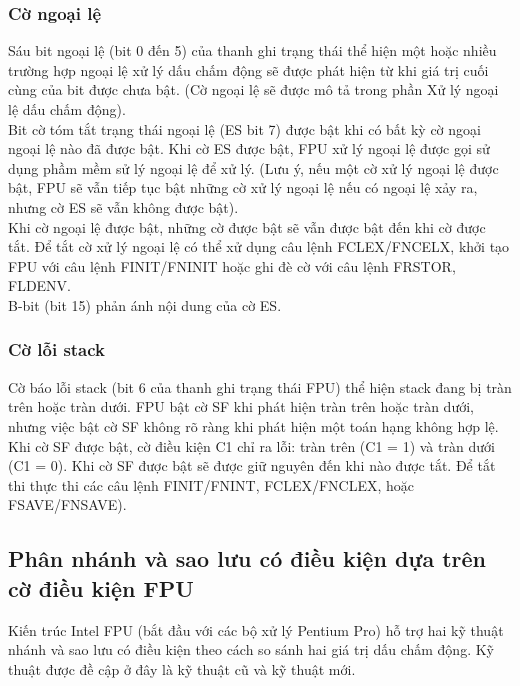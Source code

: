 		\subsubsection*{ Cờ ngoại lệ}
	Sáu bit ngoại lệ (bit 0 đến 5) của thanh ghi trạng thái thể hiện một hoặc nhiều trường hợp ngoại lệ xử lý dấu chấm động sẽ được phát hiện từ khi giá trị cuối cùng của bit được chưa bật. (Cờ ngoại lệ sẽ được mô tả trong phần Xử lý ngoại lệ dấu chấm động). \\

	Bit cờ tóm tắt trạng thái ngoại lệ (ES bit 7) được bật khi có bất kỳ cờ ngoại ngoại lệ nào đã được bật. Khi cờ ES được bật, FPU xử lý ngoại lệ được gọi sử dụng phầm mềm sử lý ngoại lệ để xử lý. (Lưu ý, nếu một cờ xử lý ngoại lệ được bật, FPU sẽ vẫn tiếp tục bật những cờ xử lý ngoại lệ nếu có ngoại lệ xảy ra, nhưng cờ ES sẽ vẫn không được bật). \\
	
	Khi cờ ngoại lệ được bật, những cờ được bật sẽ vẫn được bật đến khi cờ được tắt. Để tắt cờ xử lý ngoại lệ có thể xử dụng câu lệnh FCLEX/FNCELX, khởi tạo FPU với câu lệnh FINIT/FNINIT hoặc ghi đè cờ với câu lệnh FRSTOR, FLDENV. \\
		
		B-bit (bit 15) phản ánh nội dung của cờ ES. 
				
		\subsubsection*{ Cờ lỗi stack}
	Cờ báo lỗi stack (bit 6 của thanh ghi trạng thái FPU) thể hiện stack đang bị tràn trên hoặc tràn dưới. FPU bật cờ SF khi phát hiện tràn trên hoặc tràn dưới, nhưng việc bật cờ SF không rõ ràng khi phát hiện một toán hạng không hợp lệ. Khi cờ SF được bật,  cờ điều kiện C1 chỉ ra lỗi: tràn trên (C1 = 1) và tràn dưới (C1 = 0). Khi cờ SF được bật sẽ được giữ nguyên đến khi nào được tắt. Để tắt thi thực thi các câu lệnh FINIT/FNINT, FCLEX/FNCLEX, hoặc FSAVE/FNSAVE).

		\subsection*{ Phân nhánh và sao lưu có điều kiện dựa trên cờ điều kiện FPU}
	Kiến trúc Intel FPU (bắt đầu với các bộ xử lý Pentium Pro) hỗ trợ hai kỹ thuật nhánh và sao lưu có điều kiện theo cách so sánh hai giá trị dấu chấm động. Kỹ thuật được đề cập ở đây là kỹ thuật cũ và kỹ thuật mới.\\
	
